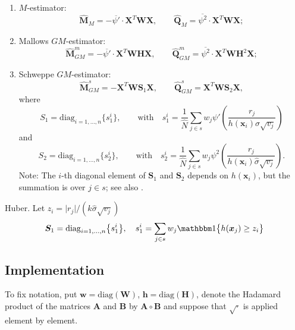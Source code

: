 \documentclass[a4paper,11pt]{scrreprt}
\theoremstyle{remark}
\begin{document}
\begin{enumerate}
   \item{$M$-estimator:}
   \begin{equation*}
      \widehat{\bm M}_M = - \overline{\psi'} \cdot \bm X^T \bm W \bm X, \qquad \widehat{\bm Q}_M = \overline{\psi^2} \cdot \bm X^T \bm W \bm X;
   \end{equation*}
   \item{Mallows $GM$-estimator:} 
   \begin{equation*}
      \widehat{\bm M}_{GM}^{m} = - \overline{\psi'} \cdot \bm X^T \bm W \bm H \bm X, \qquad \widehat{\bm Q}_{GM}^{m} = \overline{\psi^2} \cdot \bm X^T \bm W \bm H^2 \bm X;
   \end{equation*}
   \item{Schweppe $GM$-estimator:} 
   \begin{equation*}
      \widehat{\bm M}_{GM}^{s} = - \bm X^T \bm W \bm S_1 \bm X, \qquad \widehat{\bm Q}_{GM}^{s} = \bm X^T \bm W \bm S_2 \bm X,
   \end{equation*}
   where 
   \begin{equation*}
      S_1 = \mathrm{diag}_{i=1,\ldots,n} \big\{ s_1^i \big\}, \qquad \text{with} \quad s_1^i = \frac{1}{\widehat{N}}\sum_{j \in s} w_j \psi'\left(\frac{r_j}{h(\bm x_i)\widehat{\sigma} \sqrt{v_j}}\right) 
   \end{equation*}
   and 
   \begin{equation*}
      S_2 = \mathrm{diag}_{i=1,\ldots,n} \big\{ s_2^i \big\}, \qquad \text{with} \quad s_2^i = \frac{1}{\widehat{N}}\sum_{j \in s} w_j \psi^2\left(\frac{r_j}{h(\bm x_i)\widehat{\sigma} \sqrt{v_j}}\right).
   \end{equation*}
   Note: The $i$-th diagonal element of $\bm S_1$ and $\bm S_2$ depends on $h(\bm x_i)$, but the summation is over $j \in s$; see also \citet[][Chap. 6]{marazzi1987_2}.
\end{enumerate}

\noindent Huber. Let $z_i = \vert r_j \vert / (k \widehat{\sigma} \sqrt{v_j})$ 
\begin{equation*}
   \bm S_1 = \mathrm{diag}_{i=1,\ldots,n} \big\{ s_1^i \big\}, \quad s_1^i = \sum_{j \in s} w_j \indicator \big\{ h(\bm x_j) \geq z_i \big\}
\end{equation*}




\subsection{Implementation}
To fix notation, put $\bm w =\mathrm{diag}(\bm W)$, $\bm h = \mathrm{diag}(\bm H)$, denote the Hadamard product of the matrices $\bm A$ and $\bm B$ by $\bm A\circ \bm B$ and suppose that $\sqrt{\cdot}$ is applied element by element.
\end{document}
